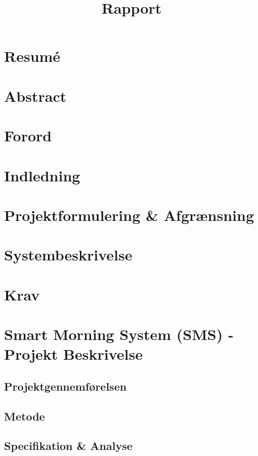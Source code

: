 \documentclass[11pt]{article}
\title{Rapport}
\begin{document}
\maketitle
\section*{Resumé}
\vfill
\pagebreak

\section*{Abstract}
\vfill
\pagebreak

\tableofcontents
\vfill
\pagebreak

\section{Forord}
\vfill
\pagebreak

\section{Indledning}
\vfill
\pagebreak
\section{Projektformulering \& Afgrænsning}
\vfill
\pagebreak

\section{Systembeskrivelse}
\vfill
\pagebreak

\section{Krav}
\vfill
\pagebreak

\section{Smart Morning System (SMS) - Projekt Beskrivelse}
\subsection{Projektgennemførelsen}
\subsection{Metode}
\subsection{Specifikation \& Analyse}
\end{document}
